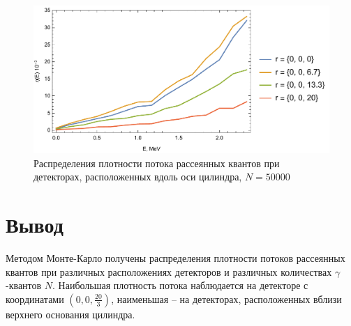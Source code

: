 \documentclass[
11pt,
master, %
subf, %
href, %
colorlinks=true, %
]{disser}
\begin{document}
\begin{figure}[htbp]
  \centering
  \includegraphics[width=0.95\linewidth]{50k_4}
  \caption{Распределения плотности потока рассеянных
квантов при детекторах, расположенных вдоль оси цилиндра, $N = 50000$}\label{}
\end{figure}

\newpage
\section{Вывод}
\noindent Методом Монте-Карло получены распределения плотности потоков рассеянных квантов при различных расположениях детекторов и различных количествах $\gamma$-квантов $N$. Наибольшая плотность потока наблюдается на детекторе с координатами $\left(0,0,\frac{20}{3}\right)$, наименьшая -- на детекторах, расположенных вблизи верхнего основания цилиндра.
\end{document}
